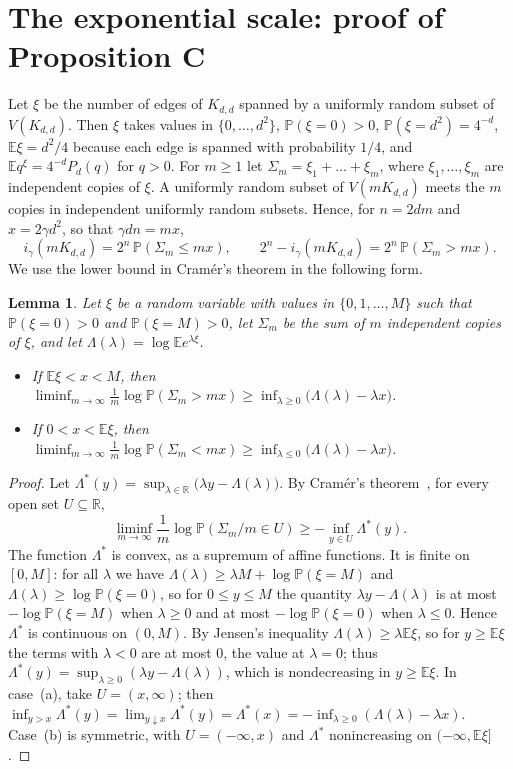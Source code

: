 \documentclass[11pt]{article}
\newtheorem{lemma}[theorem]{Lemma}
\theoremstyle{remark}
\newcommand{\Prb}{\mathbb P}
\newcommand{\Ex}{\mathbb E}
\begin{document}
\section{The exponential scale: proof of Proposition C}\label{sec:C}
Let $\xi$ be the number of edges of $K_{d,d}$ spanned by a uniformly random
subset of $V(K_{d,d})$. Then $\xi$ takes values in $\{0,\dots,d^2\}$,
$\Prb(\xi=0)>0$, $\Prb(\xi=d^2)=4^{-d}$, $\Ex\xi=d^2/4$ because each edge is
spanned with probability $1/4$, and $\Ex q^\xi=4^{-d}P_d(q)$ for $q>0$. For
$m\ge1$ let $\Sigma_m=\xi_1+\dots+\xi_m$, where $\xi_1,\dots,\xi_m$ are
independent copies of $\xi$. A uniformly random subset of $V(mK_{d,d})$ meets
the $m$ copies in
independent uniformly random subsets. Hence, for $n=2dm$ and $x=2\gamma d^2$,
so that $\gamma dn=mx$,
\begin{equation}\label{eq:prob}
 i_\gamma(mK_{d,d})=2^n\,\Prb(\Sigma_m\le mx),\qquad
 2^n-i_\gamma(mK_{d,d})=2^n\,\Prb(\Sigma_m>mx).
\end{equation}
We use the lower bound in Cramér's theorem in the following form.

\begin{lemma}\label{lem:cramer}
Let $\xi$ be a random variable with values in $\{0,1,\dots,M\}$ such that
$\Prb(\xi=0)>0$ and $\Prb(\xi=M)>0$, let $\Sigma_m$ be the sum of $m$ independent
copies of $\xi$, and let $\Lambda(\lambda)=\log\Ex e^{\lambda\xi}$.
\begin{itemize}
\item[(a)] If $\Ex\xi<x<M$, then
 $\liminf_{m\to\infty}\frac1m\log\Prb(\Sigma_m>mx)\ge
 \inf_{\lambda\ge0}\bigl(\Lambda(\lambda)-\lambda x\bigr)$.
\item[(b)] If $0<x<\Ex\xi$, then
 $\liminf_{m\to\infty}\frac1m\log\Prb(\Sigma_m<mx)\ge
 \inf_{\lambda\le0}\bigl(\Lambda(\lambda)-\lambda x\bigr)$.
\end{itemize}
\end{lemma}
\begin{proof}
Let $\Lambda^*(y)=\sup_{\lambda\in\mathbb R}\bigl(\lambda y-\Lambda(\lambda)\bigr)$.
By Cramér's theorem~\cite[Theorem~2.2.3]{dz}, for every open set
$U\subseteq\mathbb R$,
\[
 \liminf_{m\to\infty}\frac1m\log\Prb(\Sigma_m/m\in U)\ge-\inf_{y\in U}\Lambda^*(y).
\]
The function $\Lambda^*$ is convex, as a supremum of affine
functions. It is finite on $[0,M]$: for all $\lambda$ we have
$\Lambda(\lambda)\ge\lambda M+\log\Prb(\xi=M)$ and
$\Lambda(\lambda)\ge\log\Prb(\xi=0)$, so for $0\le y\le M$ the quantity
$\lambda y-\Lambda(\lambda)$ is at most $-\log\Prb(\xi=M)$ when $\lambda\ge0$ and
at most $-\log\Prb(\xi=0)$ when $\lambda\le0$. Hence $\Lambda^*$ is continuous on
$(0,M)$. By Jensen's inequality $\Lambda(\lambda)\ge\lambda\Ex\xi$, so for
$y\ge\Ex\xi$ the terms with $\lambda<0$ are at most $0$, the value at
$\lambda=0$; thus $\Lambda^*(y)=\sup_{\lambda\ge0}(\lambda y-\Lambda(\lambda))$, which
is nondecreasing in $y\ge\Ex\xi$. In case~(a), take $U=(x,\infty)$; then
$\inf_{y>x}\Lambda^*(y)=\lim_{y\downarrow x}\Lambda^*(y)=\Lambda^*(x)=
-\inf_{\lambda\ge0}(\Lambda(\lambda)-\lambda x)$. Case~(b) is symmetric, with
$U=(-\infty,x)$ and $\Lambda^*$ nonincreasing on $(-\infty,\Ex\xi]$.
\end{proof}
\end{document}

